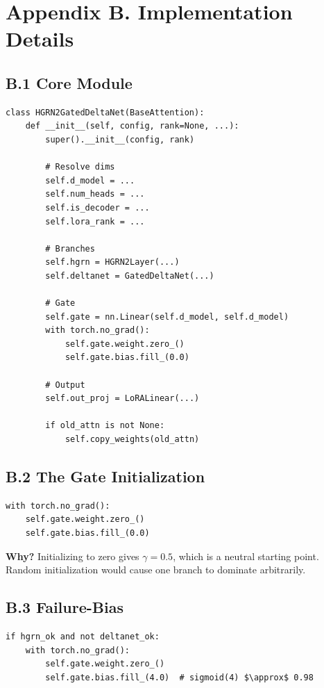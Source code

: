 \section{Appendix B. Implementation Details}

\subsection{B.1 Core Module}

\begin{lstlisting}
class HGRN2GatedDeltaNet(BaseAttention):
    def __init__(self, config, rank=None, ...):
        super().__init__(config, rank)
        
        # Resolve dims
        self.d_model = ...
        self.num_heads = ...
        self.is_decoder = ...
        self.lora_rank = ...
        
        # Branches
        self.hgrn = HGRN2Layer(...)
        self.deltanet = GatedDeltaNet(...)
        
        # Gate
        self.gate = nn.Linear(self.d_model, self.d_model)
        with torch.no_grad():
            self.gate.weight.zero_()
            self.gate.bias.fill_(0.0)
        
        # Output
        self.out_proj = LoRALinear(...)
        
        if old_attn is not None:
            self.copy_weights(old_attn)
\end{lstlisting}

\subsection{B.2 The Gate Initialization}

\begin{lstlisting}
with torch.no_grad():
    self.gate.weight.zero_()
    self.gate.bias.fill_(0.0)
\end{lstlisting}

\textbf{Why?} Initializing to zero gives $\gamma = 0.5$, which is a neutral 
starting point. Random initialization would cause one branch to dominate 
arbitrarily.

\subsection{B.3 Failure-Bias}

\begin{lstlisting}
if hgrn_ok and not deltanet_ok:
    with torch.no_grad():
        self.gate.weight.zero_()
        self.gate.bias.fill_(4.0)  # sigmoid(4) $\approx$ 0.98
\end{lstlisting}


